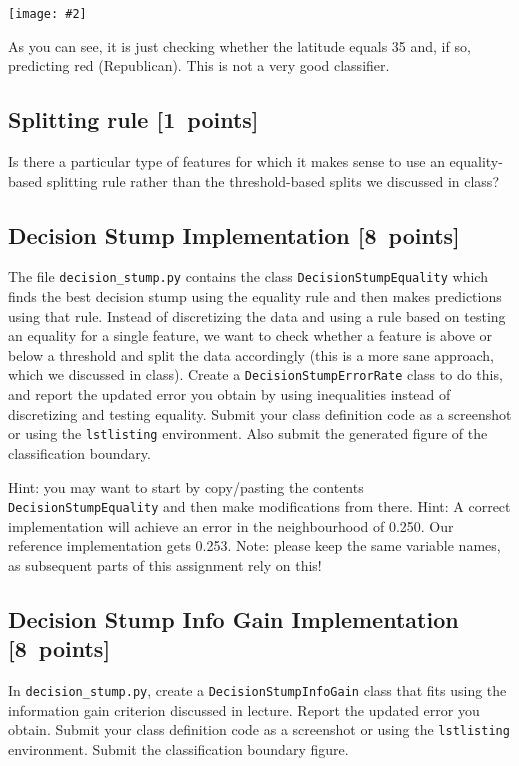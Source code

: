 \documentclass{article}
\newcommand{\blu}[1]{{\textcolor{blu}{#1}}}
\let\ask\blu
\newcommand\pts[1]{\textcolor{pointscolour}{[#1~points]}}
\newcommand{\centerfig}[2]{\begin{center}\texttt{[image: \#2]}\end{center}}
\begin{document}
  \centerfig{0.7}{./figs/q6_decisionBoundary}

  As you can see, it is just checking whether the latitude equals 35 and, if so, predicting red (Republican).
  This is not a very good classifier.

  \subsection{Splitting rule \pts{1}}

  Is there a particular type of features for which it makes sense to use an equality-based splitting rule rather than the threshold-based splits we discussed in class?


  \subsection{Decision Stump Implementation \pts{8}}

  The file \texttt{decision\string_stump.py} contains the class \texttt{DecisionStumpEquality} which
  finds the best decision stump using the equality rule and then makes predictions using that
  rule. Instead of discretizing the data and using a rule based on testing an equality for
  a single feature, we want to check whether a feature is above or below a threshold and
  split the data accordingly (this is a more sane approach, which we discussed in class).
  \ask{Create a \texttt{DecisionStumpErrorRate} class to do this, and report the updated error you
  obtain by using inequalities instead of discretizing and testing equality. 
  Submit your class definition code as a screenshot or using the \texttt{lstlisting} environment.
  Also submit the generated figure of the classification boundary.}

  Hint: you may want to start by copy/pasting the contents \texttt{DecisionStumpEquality} and then make modifications from there. 
  Hint: A correct implementation will achieve an error in the neighbourhood of 0.250. Our reference implementation gets 0.253. 
  Note: please keep the same variable names, as subsequent parts of this assignment rely on this!



  \subsection{Decision Stump Info Gain Implementation \pts{8}}

  In \texttt{decision\string_stump.py}, \ask{create a \texttt{DecisionStumpInfoGain} class that
  fits using the information gain criterion discussed in lecture.
  Report the updated error you obtain.
  Submit your class definition code as a screenshot or using the \texttt{lstlisting} environment.
  Submit the classification boundary figure.}
\end{document}
